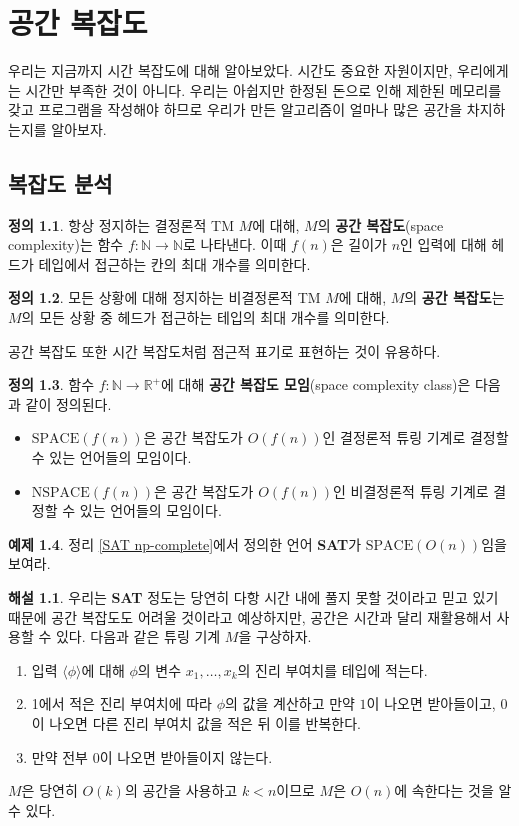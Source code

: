 \documentclass[b5paper, 11pt]{book}
\theoremstyle{definition}
\newtheorem{defn}{정의}[chapter]
\newtheorem{ex}[defn]{예제}
\newtheorem*{ans*}{해설}
\begin{document}
\chapter{공간 복잡도}
우리는 지금까지 시간 복잡도에 대해 알아보았다. 시간도 중요한 자원이지만, 우리에게는 시간만 부족한 것이 아니다. 우리는 아쉽지만 한정된 돈으로 인해 제한된 메모리를 갖고 프로그램을 작성해야 하므로 우리가 만든 알고리즘이 얼마나 많은 공간을 차지하는지를 알아보자.
\section{복잡도 분석}
\begin{defn}
    항상 정지하는 결정론적 TM $M$에 대해, $M$의 \textbf{공간 복잡도}(space complexity)는 함수 $f: \mathbb{N} \rightarrow \mathbb{N}$로 나타낸다. 이때 $f(n)$은 길이가 $n$인 입력에 대해 헤드가 테입에서 접근하는 칸의 최대 개수를 의미한다. 
\end{defn}
\begin{defn}
    모든 상황에 대해 정지하는 비결정론적 TM $M$에 대해, $M$의 \textbf{공간 복잡도}는 $M$의 모든 상황 중 헤드가 접근하는 테입의 최대 개수를 의미한다.
\end{defn}
공간 복잡도 또한 시간 복잡도처럼 점근적 표기로 표현하는 것이 유용하다.
\begin{defn}
    함수 $f : \mathbb{N} \rightarrow \mathbb{R}^+$에 대해 \textbf{공간 복잡도 모임}(space complexity class)은 다음과 같이 정의된다.
    \begin{itemize}
        \item $\text{SPACE}(f(n))$은 공간 복잡도가 $O(f(n))$인 결정론적 튜링 기계로 결정할 수 있는 언어들의 모임이다.
        \item $\text{NSPACE}(f(n))$은 공간 복잡도가 $O(f(n))$인 비결정론적 튜링 기계로 결정할 수 있는 언어들의 모임이다.
    \end{itemize}
\end{defn} 
\begin{ex}
    정리 \ref{SAT np-complete}에서 정의한 언어 \textbf{SAT}가 $\text{SPACE}(O(n))$임을 보여라. 
\end{ex}
\begin{ans*}
    우리는 \textbf{SAT} 정도는 당연히 다항 시간 내에 풀지 못할 것이라고 믿고 있기 때문에 공간 복잡도도 어려울 것이라고 예상하지만, 공간은 시간과 달리 재활용해서 사용할 수 있다. 다음과 같은 튜링 기계 $M$을 구상하자. 
    \begin{enumerate}
        \item 입력 $\langle \phi \rangle$에 대해 $\phi$의 변수 $x_1, \ldots, x_k$의 진리 부여치를 테입에 적는다. 
        \item 1에서 적은 진리 부여치에 따라 $\phi$의 값을 계산하고 만약 $1$이 나오면 받아들이고, 0이 나오면 다른 진리 부여치 값을 적은 뒤 이를 반복한다.
        \item 만약 전부 0이 나오면 받아들이지 않는다.
    \end{enumerate}
    $M$은 당연히 $O(k)$의 공간을 사용하고 $k<n$이므로 $M$은 $O(n)$에 속한다는 것을 알 수 있다.
\end{ans*}
\end{document}
